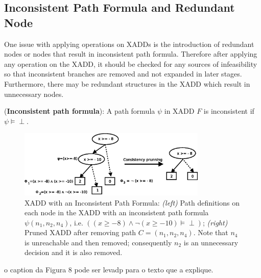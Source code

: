 \documentclass[twoside,11pt]{article}
\newenvironment{mydef}[1][Definition]{\begin{trivlist}
\item[\hskip \labelsep {\bfseries #1}]}{\end{trivlist}}
\begin{document}
\subsection{Inconsistent Path Formula and Redundant Node}


One issue with applying operations on XADDs is the introduction of redundant nodes or nodes that result in inconsistent path formula. Therefore after applying any operation on the XADD, it should be checked for any sources of infeasibility so that inconsistent branches are removed and not expanded in later stages. Furthermore, there may be redundant structures in the XADD which result in unnecessary nodes.

\begin{mydef}(\textbf{Inconsistent path formula}):
A path formula $\psi$ in XADD $F$ is inconsistent if $\psi \models \perp$.
\end{mydef}

\begin{figure}[t!]
\centering
\includegraphics[width=0.8\textwidth]{FiguresSource/consistencyPrunning.eps}
%
%
\vspace{-2mm}
\caption{%
XADD with an Inconsistent Path Formula:  {\it (left)} Path definitions on each node in the XADD with an inconsistent path formula $\psi(n_1, n_2, n_4)$, i.e. $((x \geq -8) \wedge \neg (x \geq -10) \models\perp)$; {\it (right)} Pruned XADD after removing path $C=(n_1, n_2, n_4)$. Note that $n_4$ is unreachable and then removed; consequently $n_2$ is an unnecessary decision and it is also removed. 
}
\label{fig:consistent_graph}
\end{figure}o caption da Figura 8 pode ser levadp para o texto que a explique. 
\end{document}
